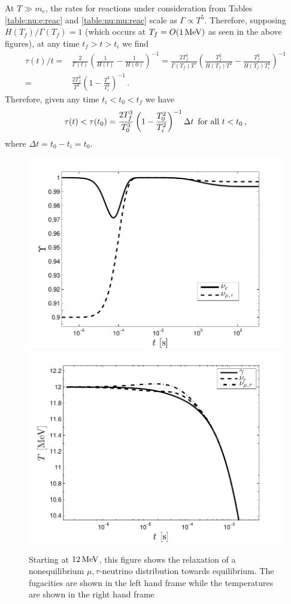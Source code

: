 At $T\gg m_e$, the rates for reactions under consideration from Tables \ref{table:nu:e:reac} and \ref{table:nu:mu:reac} scale as $\Gamma\propto T^5$. Therefore, supposing $H(T_f)/\Gamma(T_f)=1$ (which occurs at $T_f=O(1\text{\,MeV})$ as seen in the above figures), at any time $t_f>t>t_i$ we find 
\begin{align}\label{relaxTime}
\tau(t)/t=&\frac{2}{\Gamma(t)}\left(\frac{1}{H(t)}-\frac{1}{H(0)}\right)^{-1}=\frac{2T_f^5}{\Gamma(T_f)T^5}\left(\frac{T_f^2}{H(T_f)T^2}-\frac{T_f^2}{H(T_f)T_i^2}\right)^{-1}\\
=&\frac{2T_f^3}{T^3}\left(1-\frac{T^2}{T_i^2}\right)^{-1}\,.
\end{align}
Therefore, given any time $t_i<t_0<t_f$ we have
\begin{equation}\label{ch6:tauEq}
\tau(t)<\tau(t_0)=\frac{2T_f^3}{T_0^3}\left(1-\frac{T_0^2}{T_i^2}\right)^{-1}\Delta t \text{ \,for all } t<t_0\,,
\end{equation}
where $\Delta t=t_0-t_i=t_0$.

\begin{figure} 
\centerline{\includegraphics[width=0.52\linewidth]{plots/Ups_relax.pdf}\hspace*{-0.7cm}
\includegraphics[width=0.52\linewidth]{plots/T_relax.pdf}}
\caption{Starting at $12\text{\,MeV}$, this figure shows the relaxation of a nonequilibrium $\mu,\tau$-neutrino distribution towards equilibrium. The fugacities are shown in the left hand frame while the temperatures are shown in the right hand frame}
\label{fig:relax}
 \end{figure}

